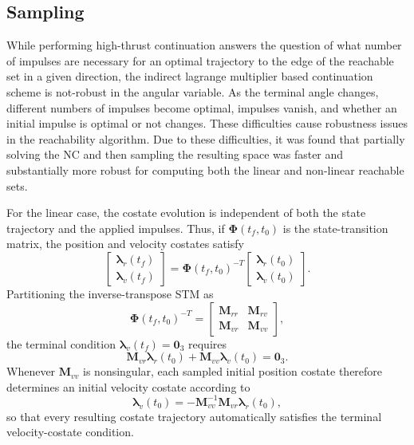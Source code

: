 \documentclass[letterpaper, 10 pt, conference]{ieeeconf}  %
\begin{document}
\subsection{Sampling}
While performing high-thrust continuation answers the question of what number of impulses are necessary for an optimal trajectory to the edge of the reachable set in a given direction, the indirect lagrange multiplier based continuation scheme is not-robust in the angular variable. 
As the terminal angle changes, different numbers of impulses become optimal, impulses vanish, and whether an initial impulse is optimal or not changes. These difficulties cause robustness issues in the reachability algorithm. Due to these difficulties, it was found that partially solving the NC and then sampling the resulting space was faster and substantially more robust for computing both the linear and non-linear reachable sets. 

For the linear case, the costate evolution is independent of both the state trajectory and the applied impulses. Thus, if $\boldsymbol{\Phi}(t_f,t_0)$ is the state-transition matrix, the position and velocity costates satisfy
\[
\begin{bmatrix}
\boldsymbol{\lambda}_r(t_f)\\
\boldsymbol{\lambda}_v(t_f)
\end{bmatrix}
=
\boldsymbol{\Phi}(t_f,t_0)^{-T}
\begin{bmatrix}
\boldsymbol{\lambda}_r(t_0)\\
\boldsymbol{\lambda}_v(t_0)
\end{bmatrix}.
\]
Partitioning the inverse-transpose STM as
\[
\boldsymbol{\Phi}(t_f,t_0)^{-T}
=
\begin{bmatrix}
\boldsymbol{M}_{rr} & \boldsymbol{M}_{rv}\\
\boldsymbol{M}_{vr} & \boldsymbol{M}_{vv}
\end{bmatrix},
\]
the terminal condition $\boldsymbol{\lambda}_v(t_f)=\mathbf{0}_3$ requires
\[
\boldsymbol{M}_{vr}\boldsymbol{\lambda}_r(t_0)
+\boldsymbol{M}_{vv}\boldsymbol{\lambda}_v(t_0)=\mathbf{0}_3.
\]
Whenever $\boldsymbol{M}_{vv}$ is nonsingular, each sampled initial position costate therefore determines an initial velocity costate according to
\[
\boldsymbol{\lambda}_v(t_0)
=-\boldsymbol{M}_{vv}^{-1}\boldsymbol{M}_{vr}
\boldsymbol{\lambda}_r(t_0),
\]
so that every resulting costate trajectory automatically satisfies the terminal velocity-costate condition.
\end{document}
